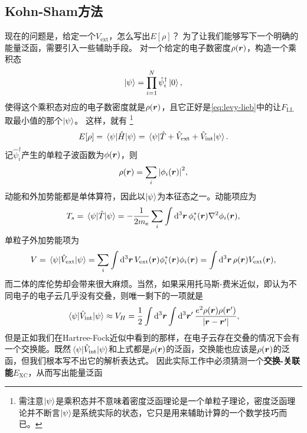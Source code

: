 \documentclass[hyperref, UTF8, a4paper]{ctexart}
\begin{document}
\subsection{Kohn-Sham方法}

现在的问题是，给定一个$V_\text{ext}$，怎么写出$E[\rho]$？
为了让我们能够写下一个明确的能量泛函，需要引入一些辅助手段。
对一个给定的电子数密度$\rho(\vb*{r})$，构造一个乘积态
\begin{equation}
    \ket{\psi} = \prod_{i=1}^N \hat{\psi}^\dagger_i \ket{0},
\end{equation}
使得这个乘积态对应的电子数密度就是$\rho(\vb*{r})$，且它正好是\eqref{eq:levy-lieb}中的让$F_\text{LL}$取最小值的那个$\ket{\psi}$。
这样，就有%
\footnote{需注意$\ket{\psi}$是乘积态并不意味着密度泛函理论是一个单粒子理论，密度泛函理论并不断言$\ket{\psi}$是系统实际的状态，它只是用来辅助计算的一个数学技巧而已。}%
\begin{equation}
    E[\rho] = \mel{\psi}{\hat{H}}{\psi} = \mel{\psi}{\hat{T} + \hat{V}_\text{ext} + \hat{V}_\text{int}}{\psi}.
\end{equation}
记$\hat{\psi}_i^\dagger$产生的单粒子波函数为$\phi(\vb*{r})$，则
\begin{equation}
    \rho(\vb*{r}) = \sum_i \abs{\phi_i(\vb*{r})}^2,
    \label{eq:kohn-sham-density}
\end{equation}
动能和外加势能都是单体算符，因此以$\ket{\psi}$为本征态之一。动能项应为
\begin{equation}
    T_s = \mel{\psi}{\hat{T}}{\psi} = - \frac{1}{2m_\text{e}} \sum_i \int \dd[3]{\vb*{r}} \phi_i^*(\vb*{r}) \laplacian \phi_i(\vb*{r}),
\end{equation}
单粒子外加势能项为
\begin{equation}
    V = \mel{\psi}{\hat{V}_\text{ext}}{\psi} = \sum_i \int \dd[3]{\vb*{r}} V_{\text{ext}}(\vb*{r}) \phi_i^*(\vb*{r}) \phi_i(\vb*{r}) = \int \dd[3]{\vb*{r}} \rho(\vb*{r}) V_\text{ext}(\vb*{r}),
\end{equation}
而二体的库伦势却会带来很大麻烦。当然，如果采用托马斯-费米近似，即认为不同电子的电子云几乎没有交叠，则唯一剩下的一项就是
\[
    \mel{\psi}{\hat{V}_\text{int}}{\psi} \approx V_H = \frac{1}{2} \int \dd[3]{\vb*{r}} \int \dd[3]{\vb*{r}'} \frac{e^2 \rho(\vb*{r}) \rho(\vb*{r}')}{\abs{\vb*{r} - \vb*{r}'}},
\]
但是正如我们在Hartree-Fock近似中看到的那样，在电子云存在交叠的情况下会有一个交换能。既然$\mel{\psi}{\hat{V}_\text{int}}{\psi}$和上式都是$\rho(\vb*{r})$的泛函，交换能也应该是$\rho(\vb*{r})$的泛函，但我们根本写不出它的解析表达式。
因此实际工作中必须猜测一个\textbf{交换-关联能}$E_\text{XC}$，从而写出能量泛函
\end{document}
